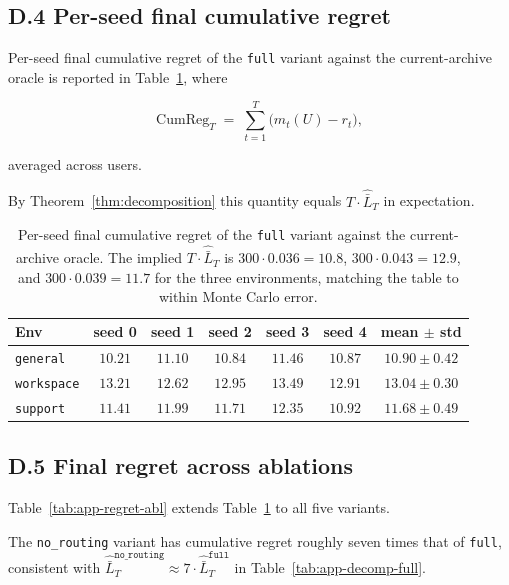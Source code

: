 \documentclass{article} %
\begin{document}
\subsection{D.4 Per-seed final cumulative regret}

\label{app:tab-regret}

Per-seed final cumulative regret of the \texttt{full} variant against the current-archive oracle is reported in Table~\ref{tab:app-regret}, where

\begin{equation}
\label{eq:app-tab-regret}
\mathrm{CumReg}_T \;=\; \sum_{t=1}^T \big(m_t(U) - r_t\big),
\end{equation}

averaged across users.

By Theorem~\ref{thm:decomposition} this quantity equals $T\cdot \widehat{\bar L}_T$ in expectation.

\begin{table}[h]
\centering
\small
\begin{tabular}{lccccc|c}
\toprule
Env & seed 0 & seed 1 & seed 2 & seed 3 & seed 4 & mean $\pm$ std \\
\midrule
\texttt{general}                 & $10.21$ & $11.10$ & $10.84$ & $11.46$ & $10.87$ & $10.90 \pm 0.42$ \\
\texttt{workspace}               & $13.21$ & $12.62$ & $12.95$ & $13.49$ & $12.91$ & $13.04 \pm 0.30$ \\
\texttt{support}                 & $11.41$ & $11.99$ & $11.71$ & $12.35$ & $10.92$ & $11.68 \pm 0.49$ \\
\bottomrule
\end{tabular}
\caption{Per-seed final cumulative regret of the \texttt{full} variant against the current-archive oracle. The implied $T\cdot \widehat{\bar L}_T$ is $300\cdot 0.036 = 10.8$, $300\cdot 0.043 = 12.9$, and $300\cdot 0.039 = 11.7$ for the three environments, matching the table to within Monte Carlo error.}
\label{tab:app-regret}
\end{table}

\subsection{D.5 Final regret across ablations}

\label{app:tab-regret-ablation}

Table~\ref{tab:app-regret-abl} extends Table~\ref{tab:app-regret} to all five variants.

The \texttt{no\_routing} variant has cumulative regret roughly seven times that of \texttt{full}, consistent with $\widehat{\bar L}_T^{\texttt{no\_routing}} \approx 7\cdot \widehat{\bar L}_T^{\texttt{full}}$ in Table~\ref{tab:app-decomp-full}.
\end{document}

